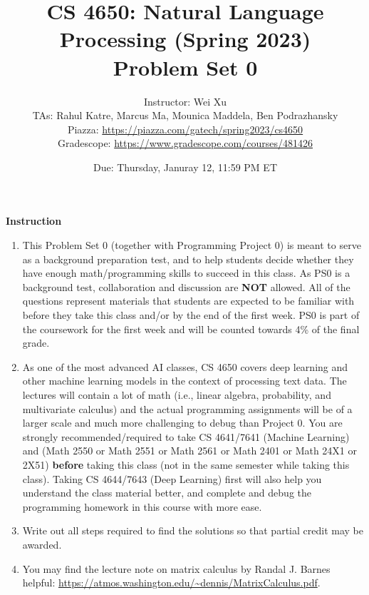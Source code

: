 \documentclass[11pt, letterpaper]{article}
\begin{document}
\title{CS 4650: Natural Language Processing (Spring 2023) \\ Problem Set 0}
\author{Instructor: Wei Xu \\ TAs: Rahul Katre, Marcus Ma, Mounica Maddela, Ben Podrazhansky
\\Piazza: \url{https://piazza.com/gatech/spring2023/cs4650}
\\Gradescope: \url{https://www.gradescope.com/courses/481426}}
\date{Due: Thursday, Januray 12, 11:59 PM ET}
\maketitle

{\Large \textbf{Instruction}}
\begin{enumerate}
    \item This Problem Set 0 (together with Programming Project 0) is meant to serve as a background preparation test, and to help students decide whether they have enough math/programming skills to succeed in this class. As PS0 is a background test, collaboration and discussion are \textbf{NOT} allowed. All of the questions represent materials that students are expected to be familiar with before they take this class and/or by the end of the first week. PS0 is part of the coursework for the first week and will be counted towards 4\%  of the final grade. 
    
    \item As one of the most advanced AI classes, CS 4650 covers deep learning and other machine learning models in the context of processing text data. The lectures will contain a lot of math (i.e., linear algebra, probability, and multivariate calculus) and the actual programming assignments will be of a larger scale and much more challenging to debug than Project 0. You are strongly recommended/required to take CS 4641/7641 (Machine Learning) and (Math 2550 or Math 2551 or Math 2561 or Math 2401 or Math 24X1 or 2X51) \textbf{before} taking this class (not in the same semester while taking this class). Taking CS 4644/7643 (Deep Learning) first will also help you understand the class material better, and complete and debug the programming homework in this course with more ease.

    
    \item Write out all steps required to find the solutions so that partial credit may be awarded.
    
    \item You may find the lecture note on matrix calculus by Randal J. Barnes helpful: \url{https://atmos.washington.edu/~dennis/MatrixCalculus.pdf}. 
    

\end{enumerate}
\end{document}
